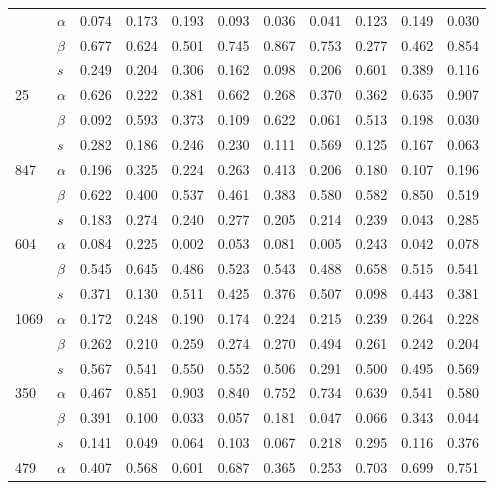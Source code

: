 \begin{longtable}{llrrrrrrrrr}
\bottomrule
\endlastfoot
\multirow{3}{*}{558} & $\alpha$ & 0.074 & 0.173 & 0.193 & 0.093 & 0.036 & 0.041 & 0.123 & 0.149 & 0.030 \\
     & $\beta$ & 0.677 & 0.624 & 0.501 & 0.745 & 0.867 & 0.753 & 0.277 & 0.462 & 0.854 \\
     & $s$ & 0.249 & 0.204 & 0.306 & 0.162 & 0.098 & 0.206 & 0.601 & 0.389 & 0.116 \\
\cline{1-11}
\multirow{3}{*}{25} & $\alpha$ & 0.626 & 0.222 & 0.381 & 0.662 & 0.268 & 0.370 & 0.362 & 0.635 & 0.907 \\
     & $\beta$ & 0.092 & 0.593 & 0.373 & 0.109 & 0.622 & 0.061 & 0.513 & 0.198 & 0.030 \\
     & $s$ & 0.282 & 0.186 & 0.246 & 0.230 & 0.111 & 0.569 & 0.125 & 0.167 & 0.063 \\
\cline{1-11}
\multirow{3}{*}{847} & $\alpha$ & 0.196 & 0.325 & 0.224 & 0.263 & 0.413 & 0.206 & 0.180 & 0.107 & 0.196 \\
     & $\beta$ & 0.622 & 0.400 & 0.537 & 0.461 & 0.383 & 0.580 & 0.582 & 0.850 & 0.519 \\
     & $s$ & 0.183 & 0.274 & 0.240 & 0.277 & 0.205 & 0.214 & 0.239 & 0.043 & 0.285 \\
\cline{1-11}
\multirow{3}{*}{604} & $\alpha$ & 0.084 & 0.225 & 0.002 & 0.053 & 0.081 & 0.005 & 0.243 & 0.042 & 0.078 \\
     & $\beta$ & 0.545 & 0.645 & 0.486 & 0.523 & 0.543 & 0.488 & 0.658 & 0.515 & 0.541 \\
     & $s$ & 0.371 & 0.130 & 0.511 & 0.425 & 0.376 & 0.507 & 0.098 & 0.443 & 0.381 \\
\cline{1-11}
\multirow{3}{*}{1069} & $\alpha$ & 0.172 & 0.248 & 0.190 & 0.174 & 0.224 & 0.215 & 0.239 & 0.264 & 0.228 \\
     & $\beta$ & 0.262 & 0.210 & 0.259 & 0.274 & 0.270 & 0.494 & 0.261 & 0.242 & 0.204 \\
     & $s$ & 0.567 & 0.541 & 0.550 & 0.552 & 0.506 & 0.291 & 0.500 & 0.495 & 0.569 \\
\cline{1-11}
\multirow{3}{*}{350} & $\alpha$ & 0.467 & 0.851 & 0.903 & 0.840 & 0.752 & 0.734 & 0.639 & 0.541 & 0.580 \\
     & $\beta$ & 0.391 & 0.100 & 0.033 & 0.057 & 0.181 & 0.047 & 0.066 & 0.343 & 0.044 \\
     & $s$ & 0.141 & 0.049 & 0.064 & 0.103 & 0.067 & 0.218 & 0.295 & 0.116 & 0.376 \\
\cline{1-11}
\multirow{3}{*}{479} & $\alpha$ & 0.407 & 0.568 & 0.601 & 0.687 & 0.365 & 0.253 & 0.703 & 0.699 & 0.751 \\

\end{longtable}
